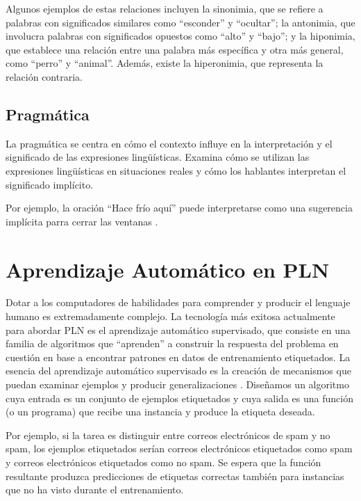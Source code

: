 \begin{example}
Algunos ejemplos de estas relaciones incluyen la sinonimia, que se refiere a palabras con significados similares como ``esconder'' y ``ocultar''; la antonimia, que involucra palabras con significados opuestos como ``alto'' y ``bajo''; y la hiponimia, que establece una relación entre una palabra más específica y otra más general, como ``perro'' y ``animal''. Además, existe la hiperonimia, que representa la relación contraria. 
\end{example}


\subsection{Pragmática}

La pragmática se centra en cómo el contexto influye en la interpretación y el significado de las expresiones lingüísticas. Examina cómo se utilizan las expresiones lingüísticas en situaciones reales y cómo los hablantes interpretan el significado implícito. 

\begin{example}
Por ejemplo, la oración ``Hace frío aquí'' puede interpretarse como una sugerencia implícita parra cerrar las ventanas \cite{fromkin2018introduction}. 
\end{example}


\section{Aprendizaje Automático en PLN}

Dotar a los computadores de habilidades para comprender y producir el lenguaje humano es extremadamente complejo. La tecnología más exitosa actualmente para abordar PLN es el aprendizaje automático supervisado, que consiste en una familia de algoritmos que ``aprenden'' a construir la respuesta del problema en cuestión en base a encontrar patrones en datos de entrenamiento etiquetados. La esencia del aprendizaje automático supervisado es la creación de mecanismos que puedan examinar ejemplos y producir generalizaciones \cite{goldberg2017neural}. Diseñamos un algoritmo cuya entrada es un conjunto de ejemplos etiquetados y cuya salida es una función (o un programa) que recibe una instancia y produce la etiqueta deseada.

Por ejemplo, si la tarea es distinguir entre correos electrónicos de spam y no spam, los ejemplos etiquetados serían correos electrónicos etiquetados como spam y correos electrónicos etiquetados como no spam. Se espera que la función resultante produzca predicciones de etiquetas correctas también para instancias que no ha visto durante el entrenamiento.

